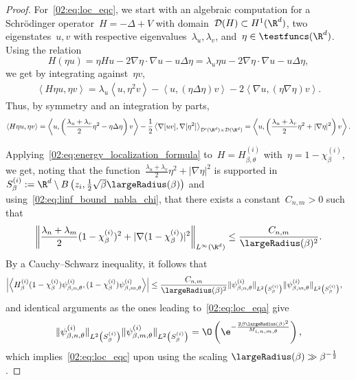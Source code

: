 \begin{proof}
        For~\eqref{02:eq:loc_eqc}, we start with an algebraic computation for a Schrödinger operator~$H = -\Delta+V$ with domain~$\mathcal D(H)\subset H^1(\R^d)$, two eigenstates~$u,v$ with respective eigenvalues~$\lambda_u,\lambda_v$, and~$\eta\in\testfuncs(\R^d)$.
        Using the relation
        \[H(\eta u) = \eta H u - 2\nabla \eta\cdot \nabla u - u \Delta \eta = \lambda_u \eta u - 2 \nabla \eta \cdot \nabla u  - u \Delta \eta,\]
        we get by integrating against~$\eta v$,
            \begin{align*}
                \left\langle H\eta u,\eta v\right\rangle = \lambda_u\left\langle u,\eta^2 v\right\rangle - \left\langle u,\left(\eta\Delta\eta\right)v\right\rangle -2 \left\langle \nabla u,\left(\eta\nabla\eta\right)v\right\rangle.
            \end{align*}
            Thus, by symmetry and an integration by parts,
            \begin{equation}
                \label{02:eq:energy_localization_formula}
                \left\langle H\eta u,\eta v\right\rangle = \left\langle u,\left(\frac{\lambda_u+\lambda_v}2\eta^2-\eta\Delta\eta\right)v\right\rangle -\frac12\left\langle \nabla[uv],\nabla[\eta^2]\right\rangle_{\mathcal D'(\R^d)\times \mathcal D(\R^d)} = \left\langle u,\left(\frac{\lambda_u+\lambda_v}2\eta^2+|\nabla\eta|^2\right)v\right\rangle.
            \end{equation}
        
        Applying~\eqref{02:eq:energy_localization_formula} to~$H = H_{\beta,\theta}^{(i)}$ with~$\eta =1-\chi_\beta^{(i)}$, we get, noting that the function~$\frac{\lambda_u+\lambda_v}2\eta^2+|\nabla\eta|^2$ is supported in~$S^{(i)}_\beta:=\R^d\setminus B\left(z_i,\frac12\sqrt\beta\largeRadius(\beta)\right)$ and using~\eqref{02:eq:linf_bound_nabla_chi}, that there exists a constant~$C_{n,m}>0$ such that
        \[\left\|\frac{\lambda_n+\lambda_m}{2}(1-\chi_\beta^{(i)})^2+|\nabla(1-\chi_\beta^{(i)})|^2\right\|_{L^\infty(\R^d)}\leq \frac{C_{n,m}}{\largeRadius(\beta)^2}.\]
        By a Cauchy--Schwarz inequality, it follows that
        \begin{equation}
            \begin{aligned}
                \left|\left\langle H_\beta^{(i)}(1-\chi_\beta^{(i)})\psi_{\beta,n,\theta}^{(i)},(1-\chi_\beta^{(i)})\psi_{\beta,m,\theta}^{(i)}\right\rangle \right| &\leq \frac{C_{n,m}}{\largeRadius(\beta)^2}\|\psi^{(i)}_{\beta,n,\theta}\|_{L^2\left(S^{(i)}_\beta\right)}\|\psi^{(i)}_{\beta,m,\theta}\|_{L^2\left(S^{(i)}_\beta\right)},
            \end{aligned}
        \end{equation}
        and identical arguments as the ones leading to~\eqref{02:eq:loc_eqa} give
        \[\|\psi^{(i)}_{\beta,n,\theta}\|_{L^2\left(S^{(i)}_\beta\right)}\|\psi^{(i)}_{\beta,m,\theta}\|_{L^2\left(S^{(i)}_\beta\right)} = \O\left(\e^{-\frac{2\beta\largeRadius(\beta)^2}{M_{i,n,m,\theta}}}\right),\]
        which implies~\eqref{02:eq:loc_eqc} upon using the scaling $\largeRadius(\beta)\gg \beta^{-\frac12}$.
    \end{proof}


